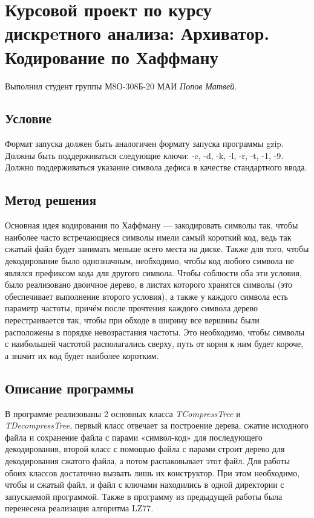 \documentclass[12pt]{article}
\begin{document}
    \section*{Курсовой проект по курсу дискрeтного анализа: 
    Архиватор. Кодирование по Хаффману}

    Выполнил студент группы М8О-308Б-20 МАИ \textit{Попов Матвей}.

    \subsection*{Условие}
    
    Формат запуска должен быть аналогичен формату запуска программы gzip. 
    Должны быть поддерживаться следующие ключи: -c, -d, -k, -l, -r, -t, -1, -9. 
    Должно поддерживаться указание символа дефиса в качестве стандартного ввода.
    

    \subsection*{Метод решения}

    Основная идея кодирования по Хаффману — закодировать символы так, чтобы 
    наиболее часто встречающиеся символы имели самый короткий код, ведь так 
    сжатый файл будет занимать меньше всего места на диске. Также для того, 
    чтобы декодирование было однозначным, необходимо, чтобы код любого символа 
    не являлся префиксом кода для другого символа. Чтобы соблюсти оба эти 
    условия, было реализовано двоичное дерево, в листах которого хранятся 
    символы (это обеспечивает выполнение второго условия), а также у каждого 
    символа есть параметр частоты, причём после прочтения каждого символа 
    дерево перестраивается так, чтобы при обходе в ширину все вершины были 
    расположены в порядке невозрастания частоты. Это необходимо, чтобы символы 
    с наибольшей частотой располагались сверху, путь от корня к ним будет 
    короче, а значит их код будет наиболее коротким.

    \subsection*{Описание программы}

    В программе реализованы 2 основных класса \textit{TCompressTree} и 
    \textit{TDecompressTree}, первый класс отвечает за построение дерева, 
    сжатие исходного файла и сохранение файла с парами «символ-код» для 
    последующего декодирования, второй класс с помощью файла с парами строит 
    дерево для декодирования сжатого файла, а потом распаковывает этот файл.
    Для работы обоих классов достаточно вызвать лишь их конструктор. При этом 
    необходимо, чтобы и сжатый файл, и файл с ключами находились в одной 
    директории с запускаемой программой. Также в программу из предыдущей работы 
    была перенесена реализация алгоритма LZ77.
\end{document}
